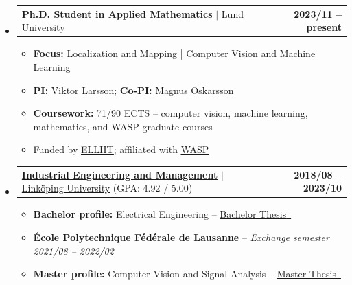 \documentclass[letterpaper,11pt]{article}
\makeatletter
\newcommand{\resumeProjectHeading}[2]{
    \item
    \begin{tabular*}{1.001\textwidth}{l@{\extracolsep{\fill}}r}
      \small#1 & \textbf{\small #2}\\
    \end{tabular*}\vspace{-7pt}
}
\newcommand{\resumeSubHeadingListStart}{\begin{itemize}[leftmargin=0.0in, label={}]}
\newcommand{\resumeSubHeadingListEnd}{\end{itemize}}
\makeatother
\begin{document}
  \resumeSubHeadingListStart
    \resumeProjectHeading
      {\textbf{\large{\underline{Ph.D. Student in Applied Mathematics}}} $|$ \large{\underline{Lund University}}}{2023/11 -- present}
      \vspace{-6pt}
      \begin{itemize}
        \item \textbf{Focus:} Localization and Mapping | Computer Vision and Machine Learning
        \item \textbf{PI:} \href{https://vlarsson.github.io/}{\underline{Viktor Larsson}}; \textbf{Co-PI:} \href{https://scholar.google.com/citations?user=zErxvQoAAAAJ&hl=en}{\underline{Magnus Oskarsson}}
        \item \textbf{Coursework:} 71/90 ECTS -- computer vision, machine learning, mathematics, and WASP graduate courses
        \item Funded by \href{https://elliit.se/}{\underline{ELLIIT}}; affiliated with \href{https://wasp-sweden.org/}{\underline{WASP}}
      \end{itemize}
  \resumeSubHeadingListEnd
  \vspace{-18pt}
    \resumeSubHeadingListStart
    \resumeProjectHeading
      {\textbf{\large{\underline{Industrial Engineering and Management}}} $|$ \large{\underline{Linköping University}} (GPA: 4.92 / 5.00)}{2018/08 -- 2023/10}
      \vspace{-6pt}
      \begin{itemize}
        \item \textbf{Bachelor profile:} Electrical Engineering -- \href{https://drive.google.com/file/d/1LhI9Oif1Pj19Uy0XpI_2b7IDi1ndWN1y/view?usp=sharing}{\underline{Bachelor Thesis}\ \raisebox{-0.1\height}\faExternalLink}
        \item \textbf{École Polytechnique Fédérale de Lausanne} -- \textit{Exchange semester} \hfill \textit{\small 2021/08 -- 2022/02}
        \item \textbf{Master profile:} Computer Vision and Signal Analysis -- \href{http://liu.diva-portal.org/smash/get/diva2:1803604/FULLTEXT01.pdf}{\underline{Master Thesis}\ \raisebox{-0.1\height}\faExternalLink}
      \end{itemize}
  \resumeSubHeadingListEnd

\end{document}
